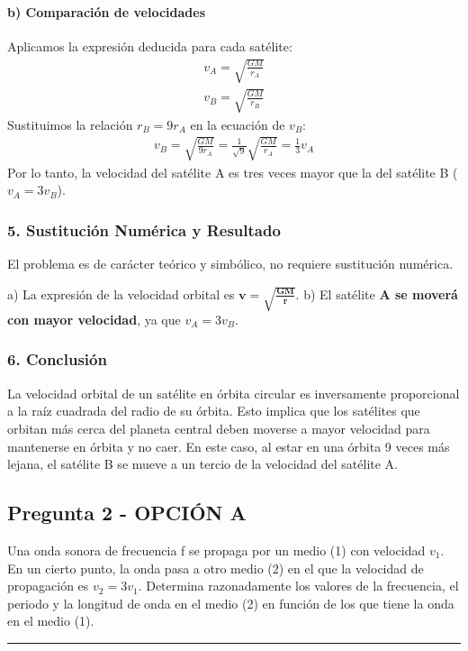 \paragraph{b) Comparación de velocidades}
Aplicamos la expresión deducida para cada satélite:
\begin{gather}
    v_A = \sqrt{\frac{GM}{r_A}} \\
    v_B = \sqrt{\frac{GM}{r_B}}
\end{gather}
Sustituimos la relación $r_B = 9r_A$ en la ecuación de $v_B$:
\begin{gather}
    v_B = \sqrt{\frac{GM}{9r_A}} = \frac{1}{\sqrt{9}} \sqrt{\frac{GM}{r_A}} = \frac{1}{3} v_A
\end{gather}
Por lo tanto, la velocidad del satélite A es tres veces mayor que la del satélite B ($v_A = 3v_B$).

\subsubsection*{5. Sustitución Numérica y Resultado}
El problema es de carácter teórico y simbólico, no requiere sustitución numérica.
\begin{cajaresultado}
    a) La expresión de la velocidad orbital es $\boldsymbol{v = \sqrt{\frac{GM}{r}}}$.
    b) El satélite \textbf{A se moverá con mayor velocidad}, ya que $v_A = 3v_B$.
\end{cajaresultado}

\subsubsection*{6. Conclusión}
\begin{cajaconclusion}
La velocidad orbital de un satélite en órbita circular es inversamente proporcional a la raíz cuadrada del radio de su órbita. Esto implica que los satélites que orbitan más cerca del planeta central deben moverse a mayor velocidad para mantenerse en órbita y no caer. En este caso, al estar en una órbita 9 veces más lejana, el satélite B se mueve a un tercio de la velocidad del satélite A.
\end{cajaconclusion}

\newpage

\subsection{Pregunta 2 - OPCIÓN A}
\label{subsec:2A_2015_jun_ord}

\begin{cajaenunciado}
Una onda sonora de frecuencia f se propaga por un medio (1) con velocidad $v_{1}$. En un cierto punto, la onda pasa a otro medio (2) en el que la velocidad de propagación es $v_{2}=3v_{1}$. Determina razonadamente los valores de la frecuencia, el periodo y la longitud de onda en el medio (2) en función de los que tiene la onda en el medio (1).
\end{cajaenunciado}
\hrule

